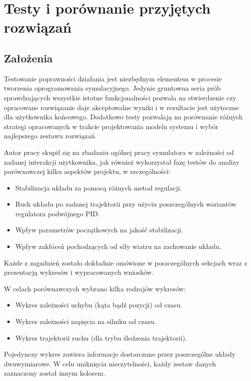 \documentclass[12pt, oneside]{report}
\theoremstyle{definition}
\begin{document}
\chapter{Testy i porównanie przyjętych rozwiązań}
\section{Założenia}
Testowanie poprawności działania jest niezbędnym elementem w procesie tworzenia oprogramowania symulacyjnego. Jedynie gruntowna seria prób sprawdzających wszystkie istotne funkcjonalności pozwala na stwierdzenie czy opracowane rozwiązanie daje akceptowalne wyniki i w rezultacie jest użyteczne dla użytkownika końcowego. Dodatkowo testy pozwalają na porównanie różnych strategi opracowanych w trakcie projektowania modelu systemu i wybór najlepszego zestawu rozwiązań. 

Autor pracy skupił się na zbadaniu ogólnej pracy symulatora w zależności od zadanej interakcji użytkownika, jak również wykorzystał fazę testów do analizy porównawczej kilku aspektów projektu, w szczególności:
\begin{itemize}
\item Stabilizacja układu za pomocą różnych metod regulacji.
\item Ruch układu po zadanej trajektorii przy użyciu poszczególnych wariantów regulatora podwójnego PID.
\item Wpływ parametrów początkowych na jakość stabilizacji.
\item Wpływ zakłóceń pochodzących od siły wiatru na zachowanie układu.
\end{itemize}

Każde z zagadnień zostało dokładnie omówione w poszczególnych sekcjach wraz z prezentacją wykresów i wypracowanych wniosków. 

W celach porównawczych wybrano kilka rodzajów wykresów:
\begin{itemize}
\item Wykres zależności uchybu (kąta bądź pozycji) od czasu.
\item Wykres zależności napięcia na silniku od czasu.
\item Wykres trajektorii ruchu (dla trybu śledzenia trajektorii).
\end{itemize}
Pojedynczy wykres zawiera informacje dostarczane przez poszczególne układy dwuwymiarowe. W celu uniknięcia nieczytelności, każdy zestaw danych zaznaczony został innym kolorem.
\end{document}
